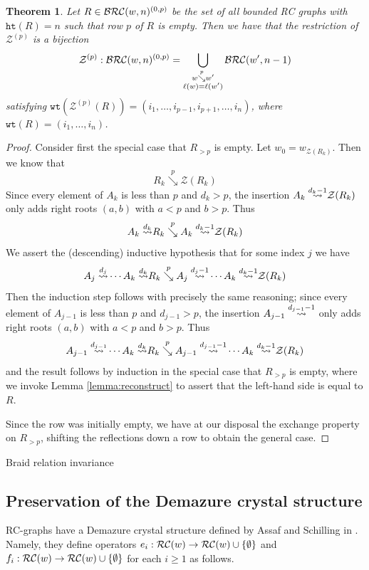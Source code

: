 \documentclass{amsart}
\newtheorem{theorem}{Theorem}[section]
\theoremstyle{definition}
\theoremstyle{remark}
\numberwithin{equation}{subsection}
\newcommand{\downvar}[1]{\stackrel{#1}{\searrow}}
\newcommand{\wof}[1]{w_{#1}}
\newcommand{\wtt}{\mathtt{wt}}
\newcommand{\zeromap}{\mathcal{Z}}
\newcommand{\hr}{\mathtt{ht}}
\begin{document}
\begin{theorem}
Let $R\in\BRC(w,n)^{(0,p)}$ be the set of all bounded RC graphs with $\hr(R)=n$ such that row $p$ of $R$ is empty. Then we have that the restriction of $\zeromap^{(p)}$ is a bijection
$$\zeromap^{(p)}:\BRC(w,n)^{(0,p)}=\bigcup_{\substack{w\downvar{p} w'\\\ell(w)=\ell(w')}} \BRC(w', n-1)$$
satisfying $\wtt(\zeromap^{(p)}(R)) = (i_1,\ldots,i_{p-1},i_{p+1},\ldots,i_{n})$, where $\wtt(R)=(i_1,\ldots,i_n)$.
\end{theorem}
\begin{proof}
Consider first the special case that $R_{>p}$ is empty. Let $w_0 = \wof{\zeromap(R_k)}$. Then we know that
$$R_k\downvar{p} \zeromap(R_k)$$
Since every element of $A_k$ is less than $p$ and $d_k>p$, the insertion $\ins{d_k-1}{A_k}\zeromap(R_k)$ only adds right roots $(a,b)$ with $a<p$ and $b>p$. Thus
$$\ins{d_k}{A_k}R_k\downvar{p} \ins{d_k-1}{A_k}\zeromap(R_k)$$
We assert the (descending) inductive hypothesis that for some index $j$ we have
$$\ins{d_j}{A_j}\cdots\ins{d_k}{A_k}R_k\downvar{p} \ins{d_j-1}{A_j}\cdots\ins{d_k-1}{A_k}\zeromap(R_k)$$
Then the induction step follows with precisely the same reasoning; since every element of $A_{j-1}$ is less than $p$ and $d_{j-1}>p$, the insertion $\ins{d_{j-1}-1}{A_{j-1}}$ only adds right roots $(a,b)$ with $a<p$ and $b>p$. Thus
$$\ins{d_{j-1}}{A_{j-1}}\cdots\ins{d_k}{A_k}R_k\downvar{p} \ins{d_{j-1}-1}{A_{j-1}}\cdots\ins{d_k-1}{A_k}\zeromap(R_k)$$
and the result follows by induction in the special case that $R_{>p}$ is empty, where we invoke Lemma \ref{lemma:reconstruct} to assert that the left-hand side is equal to $R$.

Since the row was initially empty, we have at our disposal the exchange property on $R_{>p}$, shifting the reflections down a row to obtain the general case.
\end{proof}

Braid relation invariance

\subsection{Preservation of the Demazure crystal structure}

RC-graphs have a Demazure crystal structure defined by Assaf and Schilling in \cite{assaf2018demazure}. Namely, they define operators $e_i:\RC(w)\to\RC(w)\cup\{\emptyset\}$ and $f_i:\RC(w)\to\RC(w)\cup\{\emptyset\}$ for each $i\geq 1$ as follows. 
\end{document}
